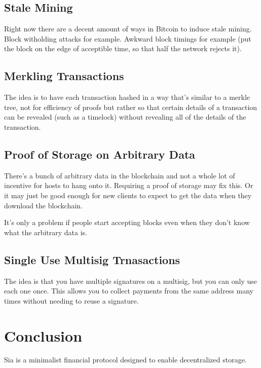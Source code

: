 \documentclass[twocolumn]{article}
\begin{document}
\subsection{Stale Mining}
Right now there are a decent amount of ways in Bitcoin to induce stale mining.
Block witholding attacks for example.
Awkward block timings for example (put the block on the edge of acceptible time, so that half the network rejects it).

\subsection{Merkling Transactions}
The idea is to have each transaction hashed in a way that's similar to a merkle tree, not for efficiency of proofs but rather so that certain details of a transaction can be revealed (such as a timelock) without revealing all of the details of the transaction.

\subsection{Proof of Storage on Arbitrary Data}
There's a bunch of arbitrary data in the blockchain and not a whole lot of incentive for hosts to hang onto it.
Requiring a proof of storage may fix this.
Or it may just be good enough for new clients to expect to get the data when they download the blockchain.

It's only a problem if people start accepting blocks even when they don't know what the arbitrary data is.

\subsection{Single Use Multisig Trnasactions}
The idea is that you have multiple signatures on a multisig, but you can only use each one once.
This allows you to collect payments from the same address many times without needing to reuse a signature.

\section{Conclusion}
Sia is a minimalist financial protocol designed to enable decentralized storage.



\end{document}
